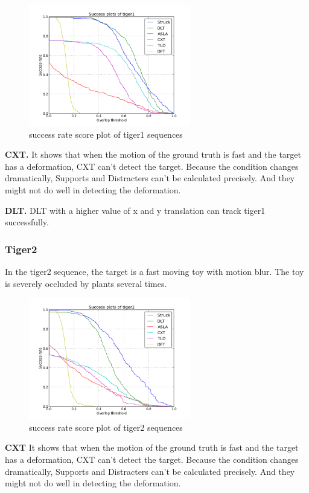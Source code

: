 \documentclass{acm_proc_article-sp}
\begin{document}
\begin{figure}[hbt]
	\centering
    \includegraphics[width=200pt]{tiger1}
    \caption{success rate score plot of tiger1 sequences}
    \label{fig:tiger1}
\end{figure}

\textbf{CXT.} It shows that when the motion of the ground truth is fast and the target has a deformation, CXT can't detect the target. Because the condition changes dramatically, Supports and Distracters can't be calculated precisely. And they might not do well in detecting the deformation.

\textbf{DLT.} DLT with a higher value of x and y translation can track tiger1 successfully.

\subsubsection{Tiger2}

In the tiger2 sequence, the target is a fast moving toy with motion blur. The toy is severely occluded by plants several times.

\begin{figure}[hbt]
	\centering
    \includegraphics[width=200pt]{tiger2}
    \caption{success rate score plot of tiger2 sequences}
    \label{fig:tiger2}
\end{figure}

\textbf{CXT} It shows that when the motion of the ground truth is fast and the target has a deformation, CXT can't detect the target. Because the condition changes dramatically, Supports and Distracters can't be calculated precisely. And they might not do well in detecting the deformation.
\end{document}
